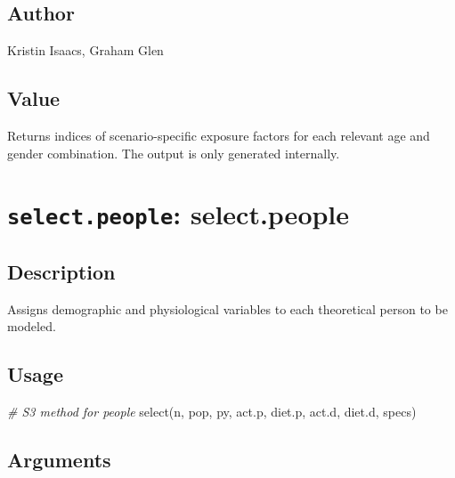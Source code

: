 \documentclass[
]{article}
\newenvironment{Shaded}{\begin{snugshade}}{\end{snugshade}}
\newcommand{\CommentTok}[1]{\textcolor[rgb]{0.56,0.35,0.01}{\textit{#1}}}
\newcommand{\FunctionTok}[1]{\textcolor[rgb]{0.00,0.00,0.00}{#1}}
\newcommand{\NormalTok}[1]{#1}
\begin{document}
\hypertarget{author-28}{%
\subsection{Author}\label{author-28}}

Kristin Isaacs, Graham Glen

\hypertarget{value-31}{%
\subsection{Value}\label{value-31}}

Returns indices of scenario-specific exposure factors for each relevant
age and gender combination. The output is only generated internally.

\hypertarget{select.people-select.people}{%
\section{\texorpdfstring{\texttt{select.people}:
select.people}{select.people: select.people}}\label{select.people-select.people}}

\hypertarget{description-49}{%
\subsection{Description}\label{description-49}}

Assigns demographic and physiological variables to each theoretical
person to be modeled.

\hypertarget{usage-49}{%
\subsection{Usage}\label{usage-49}}

\begin{Shaded}
\begin{Highlighting}[]
\CommentTok{\# S3 method for people}
\FunctionTok{select}\NormalTok{(n, pop, py, act.p, diet.p, act.d, diet.d, specs)}
\end{Highlighting}
\end{Shaded}

\hypertarget{arguments-34}{%
\subsection{Arguments}\label{arguments-34}}
\end{document}
